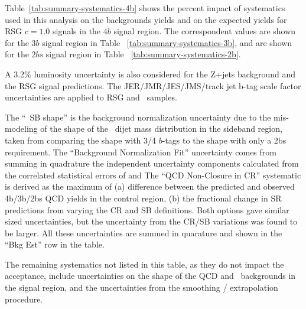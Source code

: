 Table~\ref{tab:summary-systematics-4b} shows the percent impact of systematics used in this analysis on the backgrounds yields and on the expected yields for RSG $c=1.0$ signals in the $4b$ signal region. The correspondent values are shown for the $3b$ signal region in Table ~\ref{tab:summary-systematics-3b}, and are shown for the $2bs$ signal region in Table ~\ref{tab:summary-systematics-2b}. 

A 3.2\% luminosity uncertainty is also considered for the Z+jets background and the RSG signal predictions. The JER/JMR/JES/JMS/track jet b-tag scale factor uncertainties are applied to RSG and \ttbar\ samples. 

The ``\ttbar\ SB shape'' is the background normalization uncertainty due to the mis-modeling of the 
shape of the \ttbar\ dijet mass distribution in the sideband region, taken from comparing the shape with 3/4 $b$-tags to the shape with only a 2bs requirement. The ``Background Normalization Fit'' uncertainty comes from summing in quadrature the independent uncertainty components calculated from the correlated statistical errors of \muqcd and \alphatt  The ``QCD Non-Closure in CR'' systematic is derived as the maximum of (a) difference between the predicted and observed 4b/3b/2bs QCD yields in the control region, (b) the fractional change in SR predictions from varying the CR and SB definitions.  Both options gave similar sized uncertainties, but the uncertainty from the CR/SB variations was found to be larger. All these uncertainties are summed in quarature and shown in the ``Bkg Est'' row in the table.

The remaining systematics not listed in this table, as they do not impact the acceptance, include uncertainties on the shape of the QCD and \ttbar\ backgrounds in the signal region, and the uncertainties from the smoothing / extrapolation procedure.

